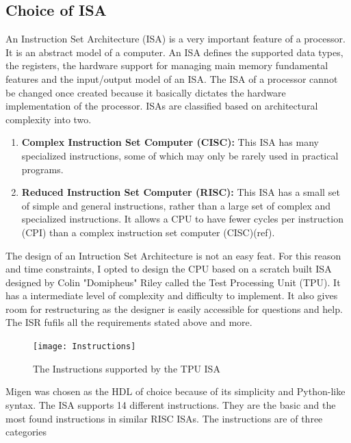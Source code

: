\subsection[ISA]{Choice of ISA}
An Instruction Set Architecture (ISA) is a very important feature of a processor. It is an abstract model of a computer. An ISA defines the supported data types, the registers, the hardware support for managing main memory fundamental features and the input/output model of an ISA. The ISA of a processor cannot be changed once created because it basically dictates the hardware implementation of the processor.
ISAs are classified based on architectural complexity into two.
\begin{enumerate}
\item \textbf{Complex Instruction Set Computer (CISC):} This ISA has many specialized instructions, some of which may only be rarely used in practical programs.
\item \textbf{Reduced Instruction Set Computer (RISC):} This ISA has a small set of simple and general instructions, rather than a large set of complex and specialized instructions. It allows a CPU to have fewer cycles per instruction (CPI) than a complex instruction set computer (CISC)(ref).
\end{enumerate}

The design of an Intruction Set Architecture is not an easy feat. For this reason and time constraints, I opted to design the CPU based on a scratch built ISA designed by Colin "Domipheus" Riley called the Test Processing Unit (TPU). It has a intermediate level of complexity and difficulty to  implement. It also gives room for restructuring as the designer is easily accessible for questions and help. The ISR fufils all the requirements stated above and more.

\begin{figure}[p]
\texttt{[image: Instructions]}
\centering
\caption{The Instructions supported by the TPU ISA}
\centering
\label{fig:instr}

\end{figure}


Migen was chosen as the HDL of choice because of its simplicity and Python-like syntax. The ISA supports 14 different instructions. They are the basic and the most found instructions in similar RISC ISAs. The instructions are of three categories 

